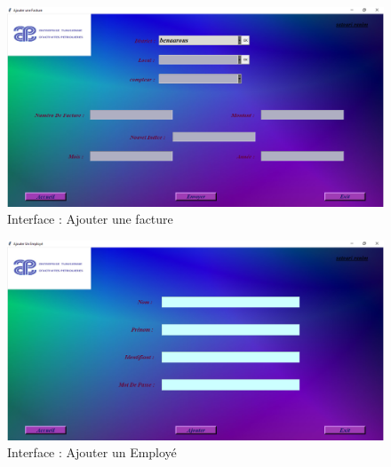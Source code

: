 \documentclass[12pt]{report}
\begin{document}
\begin{figure}[H]
  \centering
  \includegraphics[scale=0.47]{add_facture}
  \caption{Interface : Ajouter une facture}
  \label{fig:votre-label}
\end{figure}
\begin{figure}[H]
  \centering
  \includegraphics[scale=0.47]{add_user}
  \caption{Interface : Ajouter un Employé}
  \label{fig:votre-label}
\end{figure}
\end{document}

